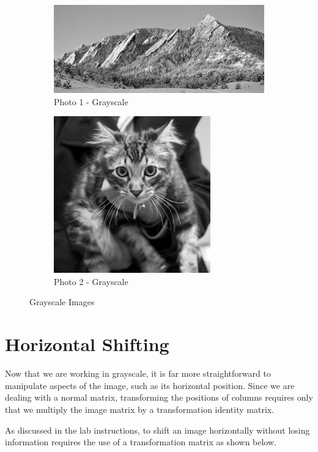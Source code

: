 \documentclass[10pt]{report}
\begin{document}
    \begin{figure}[ht]
        \centering
        \begin{subfigure}{\textwidth}
            \centering
            \includegraphics[scale=0.7]{./img/gray1.png}
            \caption{Photo 1 - Grayscale}
            \label{fig:p1g}
        \end{subfigure}
        \begin{subfigure}{\textwidth}
            \centering
            \includegraphics[scale=0.7]{./img/gray2.png}
            \caption{Photo 2 - Grayscale}
            \label{fig:p2g}
        \end{subfigure}
        \caption{Grayscale Images}
        \label{fig:gray_images}
    \end{figure}
\newpage
\section{Horizontal Shifting}

Now that we are working in grayscale, it is far more straightforward to manipulate aspects of the image, such as its horizontal position.  Since we are dealing with a normal matrix, transforming the positions of columns requires only that we multiply the image matrix by a transformation identity matrix.

As discussed in the lab instructions, to shift an image horizontally without
losing information requires the use of a transformation matrix as shown below.
\end{document}
